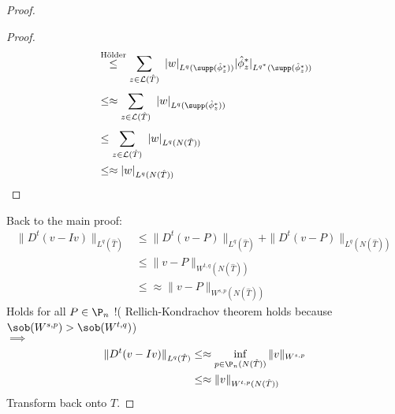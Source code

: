 \begin{proof}
\begin{itemize}
\begin{proof}
\begin{align*}
										&\overset{\text{Hölder}}{\leq} \sum\limits_{z \in\mathcal{L}(\hat{T})}^{} \ |w|_{L^q(\supp(\hat{\phi}_{z}^*))} |\hat{\phi}_{z}^*|_{L^{q^*}(\supp(\hat{\phi}_{z}^*))}\\
										&\leq\approx \sum\limits_{z \in\mathcal{L}(\hat{T})}^{} \ |w|_{L^q(\supp(\hat{\phi}_{z}^*))} \\
										&\leq \sum\limits_{z \in\mathcal{L}(\hat{T})}^{} \ |w|_{L^q(N(\hat{T}))} \\
										&\leq\approx |w|_{L^q(N(\hat{T}))} 
			\end{align*}
		\end{proof}
	\end{itemize}
	Back to the main proof:
	\begin{align*}
		\|D^t(v-Iv)\|_{L^{q}(\hat{T})} &\leq \|D^t(v-P)\|_{L^{q}(\hat{T})} + \|D^t(v-P)\|_{L^{q}(N(\hat{T}))}\\
									   &\leq \|v-P\|_{W^{t,q}(N(\hat{T}))}\\
									   &\leq\approx \|v-P\|_{W^{s,p}(N(\hat{T}))}
	\end{align*}
	Holds for all $P \in \P_{n}$ !( Rellich-Kondrachov theorem holds because\\ $\sob(W^{s,p})>\sob(W^{t,q})$)\\
	$\implies$ 
	\begin{align*}
		\|D^t(v-Iv)\|_{L^{q}(\hat{T})} &\leq\approx \inf_{p \in \P_{n}(N(\hat{T}))} \|v\|_{W^{s,p}} \\
									   &\leq\approx \|v\|_{W^{t,p}(N(\hat{T}))}
	\end{align*}
	Transform back onto $T$.
\end{proof}


